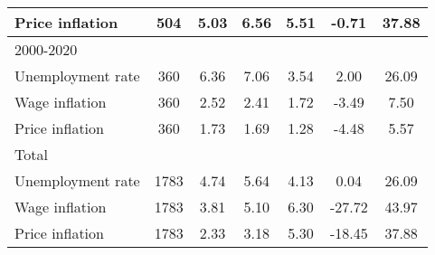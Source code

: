 \begin{table}[htbp]
\begin{tabular}{l*{1}{cccccc}}
Price inflation     &         504&        5.03&        6.56&        5.51&       -0.71&       37.88\\
\hline
2000-2020           &            &            &            &            &            &            \\
Unemployment rate   &         360&        6.36&        7.06&        3.54&        2.00&       26.09\\
Wage inflation      &         360&        2.52&        2.41&        1.72&       -3.49&        7.50\\
Price inflation     &         360&        1.73&        1.69&        1.28&       -4.48&        5.57\\
\hline
Total               &            &            &            &            &            &            \\
Unemployment rate   &        1783&        4.74&        5.64&        4.13&        0.04&       26.09\\
Wage inflation      &        1783&        3.81&        5.10&        6.30&      -27.72&       43.97\\
Price inflation     &        1783&        2.33&        3.18&        5.30&      -18.45&       37.88\\
\hline\hline
\end{tabular}
\end{table}
